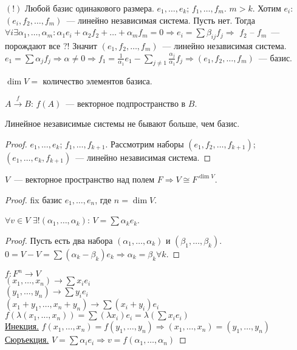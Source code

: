 \documentclass[12pt]{article}
\begin{document}
	$(!)$ Любой базис одинакового размера. $e_1, \dots, e_k$; $f_1, \dots, f_m$. $m > k$. Хотим $e_i$: $(e_i, f_2, \dots, f_m)$~--- линейно независимая система. Пусть нет. Тогда $\forall i \exists \alpha_1, \dots, \alpha_m: \alpha_1e_i + \alpha_2f_2 + \dots + \alpha_mf_m = 0 \Rightarrow e_i = \sum \beta_{ij} f_j \Rightarrow$ $f_2$ -- $f_m$~--- порождают все ?! Значит $(e_1, f_2, \dots, f_m)$~--- линейно независимая система. $e_1 = \sum \alpha_j f_j \Rightarrow \alpha \not= 0 \Rightarrow f_1 = \frac{1}{\alpha_1}e_1 - \sum\limits_{j \not= 1} \frac{\alpha_j}{\alpha_1} f_j \Rightarrow (e_1, f_2, \dots, f_m)$~--- базис.
	\begin{definition}
		$\dim V = $ количество элементов базиса.
	\end{definition}
	\noindent
	$A \xrightarrow{f} B$: $f(A)$~--- векторное подпространство в $B$.
	\begin{statement}
		Линейное независимые системы не бывают больше, чем базис.
	\end{statement}
	\begin{proof}
		$e_1, \dots, e_k$; $f_1, \dots, f_{k + 1}$. Рассмотрим наборы $(e_1, f_2, \dots, f_{k + 1})$; $(e_1, \dots, e_k, f_{k + 1})$~--- линейно независимая система.
	\end{proof}
	\begin{theorem}
		$V$~--- векторное пространство над полем $F \Rightarrow V \cong F^{\dim V}$.
	\end{theorem}
	\begin{proof}
		fix базис $e_1, \dots, e_n$, где $n = \dim V$.
		\begin{lemma}
			$\forall v \in V$ $\exists! (\alpha_1, \dots, \alpha_k)$: $V = \sum \alpha_k e_k$.
		\end{lemma}
		\begin{proof}
			Пусть есть два набора $(\alpha_1, \dots, \alpha_k)$ и $(\beta_1, \dots, \beta_k)$. $0 = V - V = \sum (\alpha_k - \beta_k)e_k \Rightarrow \alpha_k = \beta_k \forall k$.
		\end{proof}
		\noindent
		$f: F^n \rightarrow V$ \\
		$(x_1, \dots, x_n) \rightarrow \sum x_i e_i$ \\
		$(y_1, \dots, y_n) \rightarrow \sum y_i e_i$ \\
		$(x_1 + y_1, \dots, x_n + y_n) \rightarrow \sum (x_i + y_i) e_i$ \\
		$f(\lambda (x_1, \dots, x_n)) = \sum (\lambda x_i) e_i = \lambda (\sum x_i e_i)$ \\
		\underline{Инекция.} $f(x_1, \dots, x_n) = f(y_1, \dots, y_n) \Rightarrow (x_1, \dots, x_n) = (y_1, \dots, y_n)$ \\
		\underline{Сюръекция.} $V = \sum \alpha_i e_i \Rightarrow v = f(\alpha_1, \dots, \alpha_n)$
	\end{proof}
\end{document}
